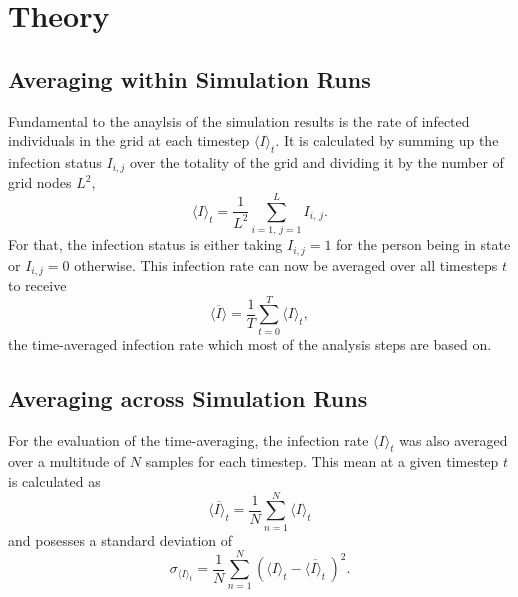 \section{Theory}

\subsection{Averaging within Simulation Runs}

Fundamental to the anaylsis of the simulation results is the rate of infected individuals in the grid at each timestep $\langle I\rangle_t$. It is calculated by summing up the infection status $I_{i,j}$
over the totality of the grid and dividing it by the number of grid nodes $L^2$,
\begin{equation}
    \langle I\rangle_t=\frac{1}{L^2}\sum_{i=1,\,j=1}^{L}I_{i,\,j}.
    \label{eq:theo_inf_rate}
\end{equation}
For that, the infection status is either taking $I_{i,j}=1$ for the person being in state \infected{} or $I_{i,j}=0$ otherwise. This infection rate can now be averaged over all timesteps $t$ to receive
\begin{equation}
    \overline{\langle I\rangle}=\frac{1}{T}\sum_{t=0}^{T}\langle I\rangle_t,
    \label{eq:theo_time_avg_inf_rate}
\end{equation}
the time-averaged infection rate which most of the analysis steps are based on.

\subsection{Averaging across Simulation Runs}

For the evaluation of the time-averaging, the infection rate $\langle I\rangle_t$ was also averaged over a multitude of $N$ samples for each timestep. This mean at a given timestep $t$ is calculated as
\begin{equation}
    \overline{\langle I\rangle_t}=\frac{1}{N}\sum_{n=1}^{N}\langle I\rangle_t
    \label{eq:theo_mean_inf_rate}
\end{equation}
and posesses a standard deviation of
\begin{equation}
    \sigma_{\langle I\rangle_t}=\frac{1}{N}\sum_{n=1}^{N}\left(\langle I\rangle_t-\overline{\langle I\rangle_t}\,\right)^2.
    \label{eq:theo_sigma_inf_rate}
\end{equation}